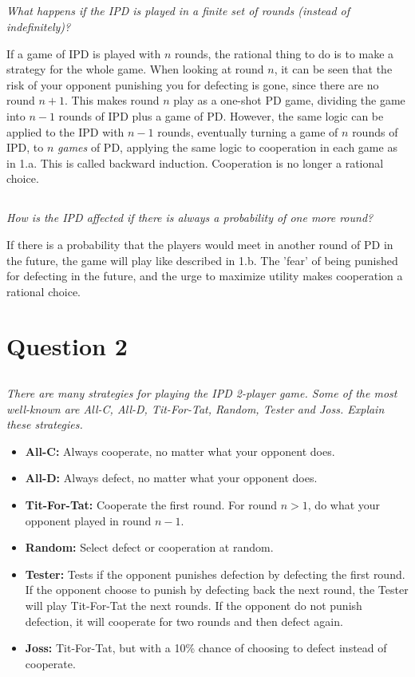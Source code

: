 \documentclass{article}
\begin{document}
\subsection{ }
\textit{What happens if the IPD is played in a finite set of rounds (instead of indefinitely)?}

If a game of IPD is played with \(n\) rounds, the rational thing to do is to make a strategy for the whole game. When looking at round \(n\), it can be seen that the risk of your opponent punishing you for defecting is gone, since there are no round \(n+1\). This makes round \(n\) play as a one-shot PD game, dividing the game into \(n-1\) rounds of IPD plus a game of PD. However, the same logic can be applied to the IPD with \(n-1\) rounds, eventually turning a game of \(n\) rounds of IPD, to \(n\) \textit{games} of PD, applying the same logic to cooperation in each game as in 1.a. This is called backward induction. Cooperation is no longer a rational choice.

\subsection{ }
\textit{How is the IPD affected if there is always a probability of one more round?}

If there is a probability that the players would meet in another round of PD in the future, the game will play like described in 1.b. The 'fear' of being punished for defecting in the future, and the urge to maximize utility makes cooperation a rational choice.

\section{Question 2}
\subsection{ }
\textit{There are many strategies for playing the IPD 2-player game. Some of the most well-known are
All-C, All-D, Tit-For-Tat, Random, Tester and Joss. Explain these strategies.}

\begin{itemize}
\item \textbf{All-C:} Always cooperate, no matter what your opponent does.
\item \textbf{All-D:} Always defect, no matter what your opponent does.
\item \textbf{Tit-For-Tat:} Cooperate the first round. For round \(n > 1\), do what your opponent played in round \(n-1\).
\item \textbf{Random:} Select defect or cooperation at random.
\item \textbf{Tester:} Tests if the opponent punishes defection by defecting the first round. If the opponent choose to punish by defecting back the next round, the Tester will play Tit-For-Tat the next rounds. If the opponent do not punish defection, it will cooperate for two rounds and then defect again.
\item \textbf{Joss:} Tit-For-Tat, but with a 10\% chance of choosing to defect instead of cooperate.
\end{itemize}
\end{document}

